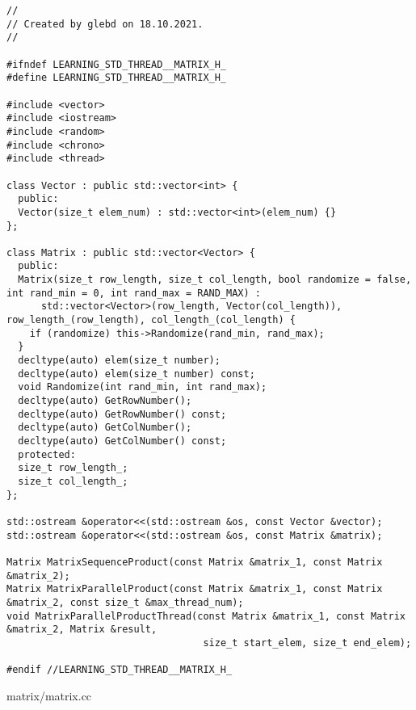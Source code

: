\documentclass{report}
\begin{document}
\begin{lstlisting}
//
// Created by glebd on 18.10.2021.
//

#ifndef LEARNING_STD_THREAD__MATRIX_H_
#define LEARNING_STD_THREAD__MATRIX_H_

#include <vector>
#include <iostream>
#include <random>
#include <chrono>
#include <thread>

class Vector : public std::vector<int> {
  public:
  Vector(size_t elem_num) : std::vector<int>(elem_num) {}
};

class Matrix : public std::vector<Vector> {
  public:
  Matrix(size_t row_length, size_t col_length, bool randomize = false, int rand_min = 0, int rand_max = RAND_MAX) :
      std::vector<Vector>(row_length, Vector(col_length)), row_length_(row_length), col_length_(col_length) {
    if (randomize) this->Randomize(rand_min, rand_max);
  }
  decltype(auto) elem(size_t number);
  decltype(auto) elem(size_t number) const;
  void Randomize(int rand_min, int rand_max);
  decltype(auto) GetRowNumber();
  decltype(auto) GetRowNumber() const;
  decltype(auto) GetColNumber();
  decltype(auto) GetColNumber() const;
  protected:
  size_t row_length_;
  size_t col_length_;
};

std::ostream &operator<<(std::ostream &os, const Vector &vector);
std::ostream &operator<<(std::ostream &os, const Matrix &matrix);

Matrix MatrixSequenceProduct(const Matrix &matrix_1, const Matrix &matrix_2);
Matrix MatrixParallelProduct(const Matrix &matrix_1, const Matrix &matrix_2, const size_t &max_thread_num);
void MatrixParallelProductThread(const Matrix &matrix_1, const Matrix &matrix_2, Matrix &result,
                                  size_t start_elem, size_t end_elem);

#endif //LEARNING_STD_THREAD__MATRIX_H_  
\end{lstlisting}
matrix/matrix.cc
\end{document}
